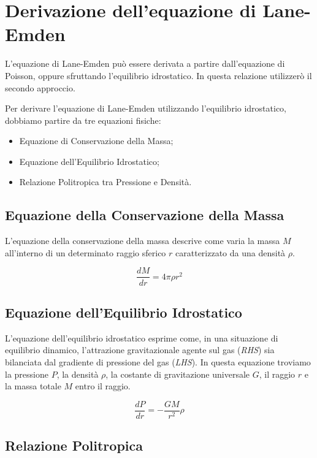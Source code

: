 \documentclass{article}
\begin{document}
\section{Derivazione dell'equazione di Lane-Emden}

L'equazione di Lane-Emden può essere derivata a partire dall'equazione di Poisson, oppure sfruttando l'equilibrio idrostatico. In questa relazione utilizzerò il secondo approccio.

Per derivare l'equazione di Lane-Emden utilizzando l'equilibrio idrostatico, dobbiamo partire da tre equazioni fisiche:

\begin{itemize}
 \item Equazione di Conservazione della Massa;
 \item Equazione dell'Equilibrio Idrostatico;
 \item Relazione Politropica tra Pressione e Densità.
\end{itemize}


\subsection{Equazione della Conservazione della Massa}

L'equazione della conservazione della massa descrive come varia la massa $M$ all'interno di un determinato raggio sferico $r$ caratterizzato da una densità $\rho$.

\begin{equation}\label{eqn:MCE}
 \frac{dM}{dr} = 4\pi \rho r^2
\end{equation}

\subsection{Equazione dell'Equilibrio Idrostatico}

L'equazione dell'equilibrio idrostatico esprime come, in una situazione di equilibrio dinamico, l'attrazione gravitazionale agente sul gas (\emph{RHS}) sia bilanciata dal gradiente di pressione del gas (\emph{LHS}). In questa equazione troviamo la pressione $P$, la densità $\rho$, la costante di gravitazione universale $G$, il raggio $r$ e la massa totale $M$ entro il raggio.

\begin{equation}\label{eqn:HSE}
 \frac{dP}{dr} = - \frac{GM}{r^2}\rho
\end{equation}

\subsection{Relazione Politropica}
\end{document}
